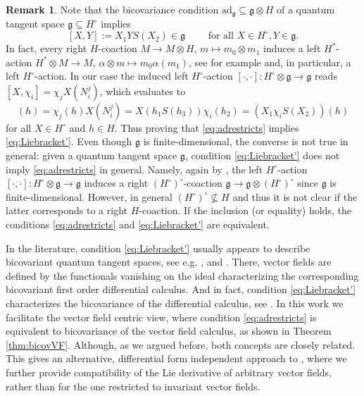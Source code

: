 \documentclass{article}
\theoremstyle{definition}
\newtheorem{remark}[thm]{Remark}
\begin{document}
	\begin{remark}\label{rem:bracket}
		Note that the bicovariance condition $\mathrm{ad}_\mathfrak{g}\subseteq\mathfrak{g}\otimes H$ of a quantum tangent space $\mathfrak{g}\subseteq H^\circ$ implies 
		\begin{equation}\label{eq:Liebracket'}
			[X,Y]:=X_1YS(X_2)\in\mathfrak{g}\qquad\text{ for all }X\in H^\circ, Y\in\mathfrak{g}.
		\end{equation}
		In fact, every right $H$-coaction $M\to M\otimes H$, $m\mapsto m_0\otimes m_1$ induces a left $H^*$-action $H^*\otimes M\to M$, $\alpha\otimes m\mapsto m_0\alpha(m_1)$, see for example \cite[Lemma 1.6.4]{mont} and, in particular, a left $H^\circ$-action. In our case the induced left $H^\circ$-action $[\cdot,\cdot]\colon H^\circ\otimes\mathfrak{g}\to\mathfrak{g}$ reads $[X,\chi_i]=\chi_jX(N_i^j)$, which evaluates to
		\begin{equation}
			[X,\chi_i](h)
			=\chi_j(h)X(N_i^j)
			=X(h_1S(h_3))\chi_i(h_2)
			=(X_1\chi_iS(X_2))(h)
		\end{equation}
		for all $X\in H^\circ$ and $h\in H$. Thus proving that \eqref{eq:adrestricts} implies \eqref{eq:Liebracket'}. Even though $\mathfrak{g}$ is finite-dimensional, the converse is not true in general: given a quantum tangent space $\mathfrak{g}$, condition \eqref{eq:Liebracket'} does not imply \eqref{eq:adrestricts} in general. Namely, again by \cite[Lemma 1.6.4]{mont}, the left $H^\circ$-action $[\cdot,\cdot]\colon H^\circ\otimes\mathfrak{g}\to\mathfrak{g}$ induces a right $(H^\circ)^\circ$-coaction $\mathfrak{g}\to\mathfrak{g}\otimes(H^\circ)^\circ$ since $\mathfrak{g}$ is finite-dimensional. However, in general $(H^\circ)^\circ\nsubseteq H$ and thus it is not clear if the latter corresponds to a right $H$-coaction. If the inclusion (or equality) holds, the conditions \eqref{eq:adrestricts} and \eqref{eq:Liebracket'} are equivalent.
		
		In the literature, condition \eqref{eq:Liebracket'} usually appears to describe bicovariant quantum tangent spaces, see e.g. \cite[Section 5]{Woronowicz1989}, \cite[Section 14.2.3]{ks} and \cite[Section 2.3.1]{AschieriThesis}. There, vector fields are defined by the functionals vanishing on the ideal characterizing the corresponding bicovariant first order differential calculus. And in fact, condition \eqref{eq:Liebracket'} characterizes the bicovariance of the differential calculus, see \cite[Corollary 14.9]{ks}. In this work we facilitate the vector field centric view, where condition \eqref{eq:adrestricts} is equivalent to bicovariance of the vector field calculus, as shown in Theorem \ref{thm:bicovVF}. Although, as we argued before, both concepts are closely related. This gives an alternative, differential form independent approach to \cite[Section 4]{AschieriSchupp}, where we further provide compatibility of the Lie derivative of arbitrary vector fields, rather than for the one restricted to invariant vector fields.
	\end{remark}
	
\end{document}
